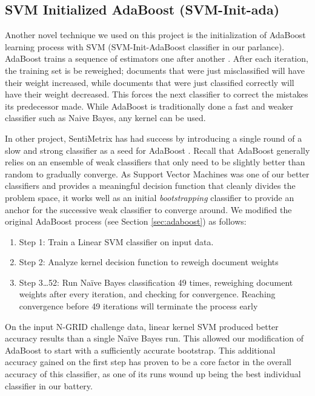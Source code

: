 \subsection{SVM Initialized AdaBoost (SVM-Init-ada)}
Another novel technique we used on this project is the initialization of AdaBoost learning
process with SVM (\textsf{SVM-Init-AdaBoost} classifier in our parlance). AdaBoost trains
a sequence of  estimators one after another \cite{adaboost}. After each iteration, the training set is be reweighed; documents that were just misclassified will have their weight increased, while documents that were just classified correctly will have their weight decreased. This forces the next classifier to correct the mistakes its predecessor made. While AdaBoost is traditionally done a fast and weaker classifier such as Naive Bayes, any kernel can be used. 

In other project, SentiMetrix has had success by introducing a single round of a slow and strong classifier as a seed for AdaBoost \cite{darpa}. Recall that AdaBoost generally relies on an ensemble of weak classifiers that only need to be slightly better than random to gradually converge. As Support Vector Machines was one of our better classifiers and provides a meaningful decision function that cleanly divides the problem space, it works well as an initial \textit{bootstrapping} classifier to provide an anchor for the successive weak classifier to converge around. We modified the original AdaBoost process (see Section \ref{sec:adaboost}) as follows:

\begin{enumerate}
    \item \textsf{Step 1:} Train a Linear SVM classifier on input data. 
    \item \textsf{Step 2:} Analyze kernel decision function to reweigh document weights
    \item \textsf{Step 3\ldots52:} Run Na\"{i}ve Bayes classification 49 times, reweighing document weights after every iteration, and checking for convergence. Reaching convergence before 49 iterations will terminate the process early
\end{enumerate}

On the input N-GRID challenge data, linear kernel SVM produced better accuracy results than a single Na\"{i}ve Bayes run. This allowed our modification of AdaBoost to start with a sufficiently accurate bootstrap. This additional accuracy gained on the first step has proven to be  a core factor in the overall accuracy of this classifier, as one of its runs wound up being the best individual classifier in our battery.

